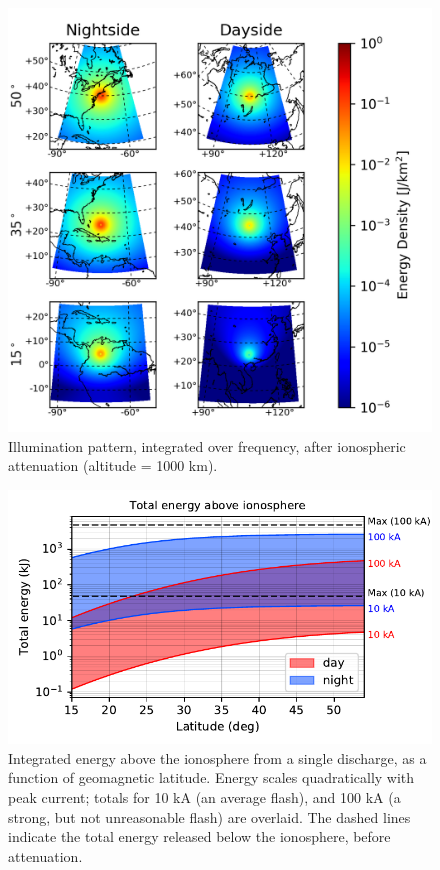 \begin{figure}
\begin{center}
\includegraphics{figures/illumination_basemap.png}
\caption[Illumination pattern above the ionosphere]{Illumination pattern, integrated over frequency, after ionospheric attenuation (altitude = 1000 km).}
\label{fig:illumination}
\end{center}
\end{figure}

\begin{figure}
\begin{center}
\includegraphics{figures/total_energy.pdf}
\caption[Energy above the ionosphere due to a single flash]{Integrated energy above the ionosphere from a single discharge, as a function of geomagnetic latitude. Energy scales quadratically with peak current; totals for 10 kA (an average flash), and 100 kA (a strong, but not unreasonable flash) are overlaid. The dashed lines indicate the total energy released below the ionosphere, before attenuation.}
\label{fig:illumination_totals}
\end{center}
\end{figure}


